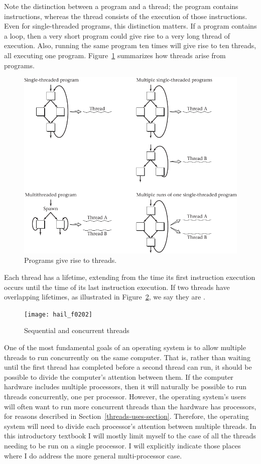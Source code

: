 Note the distinction between a program and a thread; the program
contains instructions, whereas the thread consists of the execution of
those instructions.  Even for single-threaded programs, this
distinction matters.  If a program contains a loop, then a very short
program could give rise to a very long thread of execution.  Also,
running the same program ten times will give rise to ten threads, all
executing one program.  Figure~\ref{scan-2-1} summarizes how threads
arise from programs.
\begin{figure}
\centerline{\includegraphics{hail_f0201}}
\caption{Programs give rise to threads.}
\label{scan-2-1}
\end{figure}

Each thread has a lifetime, extending from the time its first
instruction execution occurs until the time of its last instruction
execution.  If two threads have overlapping lifetimes, as illustrated
in Figure~\ref{scan-2-2}, we say they are
.
\begin{figure}
\centerline{\texttt{[image: hail\_f0202]}}
\caption{Sequential and concurrent threads}
\label{scan-2-2}
\end{figure}
One of the most fundamental goals of an operating system is to allow
multiple threads to run concurrently on the same computer.  That is,
rather than waiting until the first thread has completed before a
second thread can run, it should be possible to divide the computer's
attention between them.  If the computer hardware includes multiple
processors, then it will naturally be possible to run threads
concurrently, one per processor.  However, the operating system's
users will often want to run more concurrent threads than the hardware
has processors, for reasons described in Section~\ref{threads-uses-section}.  Therefore, the operating
system will need to divide each processor's attention between multiple
threads.  In this introductory textbook I will mostly limit myself
to the case of all the threads needing to be run on a
single processor.  I will explicitly indicate those places where I
do address the more general multi-processor case.

